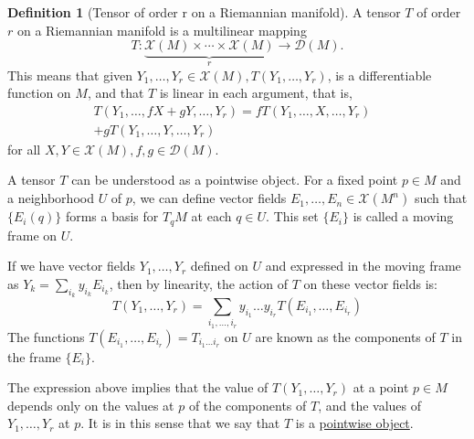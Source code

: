 \documentclass{amsart}
\theoremstyle{plain}
\theoremstyle{definition}
\newtheorem{definition}[theorem]{Definition}
\theoremstyle{remark}
\begin{document}
\begin{definition}[Tensor of order r on a Riemannian manifold]
A tensor $T$ of order $r$ on a Riemannian manifold is a multilinear mapping
\[
T: \underbrace{\mathcal{X}(M) \times \cdots \times \mathcal{X}(M)}_r \rightarrow \mathcal{D}(M) .
\]This means that given $Y_1, \ldots, Y_r \in \mathcal{X}(M), T\left(Y_1, \ldots, Y_r\right)$, is a differentiable function on $M$, and that $T$ is linear in each argument, that is,
\[
\begin{aligned}
T\left(Y_1, \ldots, f X+g Y, \ldots, Y_r\right)=f T\left(Y_1, \ldots, X, \ldots, Y_r\right) & \\
+g T\left(Y_1, \ldots, Y, \ldots, Y_r\right) &
\end{aligned}
\]for all $X, Y \in \mathcal{X}(M), f, g \in \mathcal{D}(M)$.
\end{definition}
A tensor $T$ can be understood as a pointwise object. For a fixed point $p \in M$ and a neighborhood $U$ of $p$, we can define vector fields $E_1, \ldots, E_n \in \mathcal{X}(M^n)$ such that $\{E_i(q)\}$ forms a basis for $T_q M$ at each $q \in U$. This set $\{E_i\}$ is called a moving frame on $U$.

If we have vector fields $Y_1, \ldots, Y_r$ defined on $U$ and expressed in the moving frame as $Y_k = \sum_{i_k} y_{i_k} E_{i_k}$, then by linearity, the action of $T$ on these vector fields is:
\[
T\left(Y_1, \ldots, Y_r\right)=\sum_{i_1, \ldots, i_r} y_{i_1} \ldots y_{i_r} T\left(E_{i_1}, \ldots, E_{i_r}\right)
\]
The functions $T(E_{i_1}, \ldots, E_{i_r}) = T_{i_1 \ldots i_r}$ on $U$ are known as the components of $T$ in the frame $\{E_i\}$.

The expression above implies that the value of $T\left(Y_1, \ldots, Y_r\right)$ at a point $p \in M$ depends only on the values at $p$ of the components of $T$, and the values of $Y_1, \ldots, Y_r$ at $p$. It is in this sense that we say that $T$ is a \underline{pointwise object}.
\end{document}

